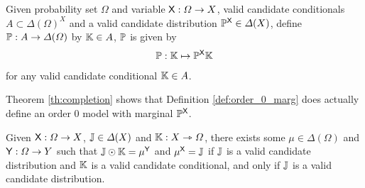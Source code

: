 \begin{definition}\label{def:order_0_marg}
Given probability set $\Omega$ and variable $\mathsf{X}:\Omega \to X$, valid candidate conditionals $A\subset \Delta(\Omega)^X$ and a valid candidate distribution $\mathbb{P}^{\mathsf{X}}\in \Delta(X)$, define $\mathbb{P}:A\to \Delta(\Omega)$ by $\mathbb{K}\in A$, $\mathbb{P}$ is given by
\begin{align}
	\mathbb{P}: \mathbb{K}\mapsto \mathbb{P}^{\mathsf{X}}\mathbb{K}
\end{align}
for any valid candidate conditional $\mathbb{K}\in A$.
\end{definition}

Theorem \ref{th:completion} shows that Definition \ref{def:order_0_marg} does actually define an order 0 model with marginal $\mathbb{P}^{\mathsf{X}}$.

\begin{theorem}[Completion]\label{th:completion}
Given $\mathsf{X}:\Omega\to X$, $\mathbb{J}\in \Delta(X)$ and $\mathbb{K}:X\rightarrowtriangle \Omega$, there exists some $\mu\in \Delta(\Omega)$ and $\mathsf{Y}:\Omega\to Y$ such that $\mathbb{J}\odot \mathbb{K}=\mu^{\mathsf{Y}}$ and $\mu^{\mathsf{X}}=\mathbb{J}$ if $\mathbb{J}$ is a valid candidate distribution and $\mathbb{K}$ is a valid candidate conditional, and only if $\mathbb{J}$ is a valid candidate distribution.
\end{theorem}

